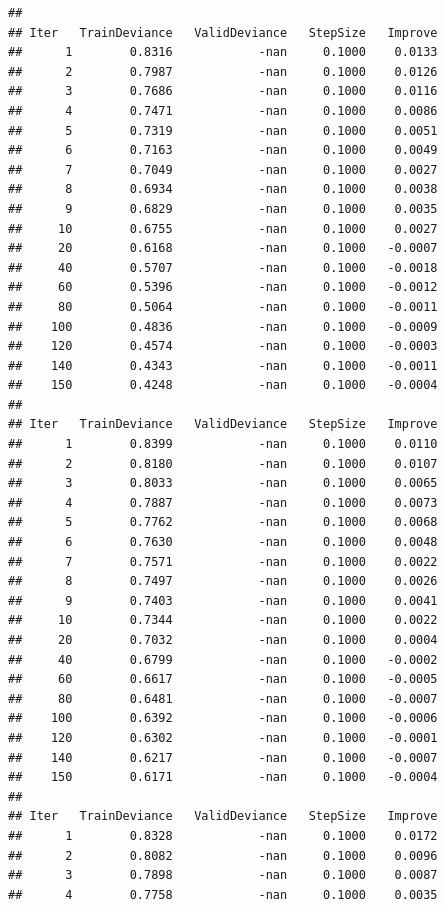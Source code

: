 \documentclass[]{book}
\begin{document}
\begin{verbatim}
## 
## Iter   TrainDeviance   ValidDeviance   StepSize   Improve
##      1        0.8316            -nan     0.1000    0.0133
##      2        0.7987            -nan     0.1000    0.0126
##      3        0.7686            -nan     0.1000    0.0116
##      4        0.7471            -nan     0.1000    0.0086
##      5        0.7319            -nan     0.1000    0.0051
##      6        0.7163            -nan     0.1000    0.0049
##      7        0.7049            -nan     0.1000    0.0027
##      8        0.6934            -nan     0.1000    0.0038
##      9        0.6829            -nan     0.1000    0.0035
##     10        0.6755            -nan     0.1000    0.0027
##     20        0.6168            -nan     0.1000   -0.0007
##     40        0.5707            -nan     0.1000   -0.0018
##     60        0.5396            -nan     0.1000   -0.0012
##     80        0.5064            -nan     0.1000   -0.0011
##    100        0.4836            -nan     0.1000   -0.0009
##    120        0.4574            -nan     0.1000   -0.0003
##    140        0.4343            -nan     0.1000   -0.0011
##    150        0.4248            -nan     0.1000   -0.0004
## 
## Iter   TrainDeviance   ValidDeviance   StepSize   Improve
##      1        0.8399            -nan     0.1000    0.0110
##      2        0.8180            -nan     0.1000    0.0107
##      3        0.8033            -nan     0.1000    0.0065
##      4        0.7887            -nan     0.1000    0.0073
##      5        0.7762            -nan     0.1000    0.0068
##      6        0.7630            -nan     0.1000    0.0048
##      7        0.7571            -nan     0.1000    0.0022
##      8        0.7497            -nan     0.1000    0.0026
##      9        0.7403            -nan     0.1000    0.0041
##     10        0.7344            -nan     0.1000    0.0022
##     20        0.7032            -nan     0.1000    0.0004
##     40        0.6799            -nan     0.1000   -0.0002
##     60        0.6617            -nan     0.1000   -0.0005
##     80        0.6481            -nan     0.1000   -0.0007
##    100        0.6392            -nan     0.1000   -0.0006
##    120        0.6302            -nan     0.1000   -0.0001
##    140        0.6217            -nan     0.1000   -0.0007
##    150        0.6171            -nan     0.1000   -0.0004
## 
## Iter   TrainDeviance   ValidDeviance   StepSize   Improve
##      1        0.8328            -nan     0.1000    0.0172
##      2        0.8082            -nan     0.1000    0.0096
##      3        0.7898            -nan     0.1000    0.0087
##      4        0.7758            -nan     0.1000    0.0035

\end{verbatim}
\end{document}
